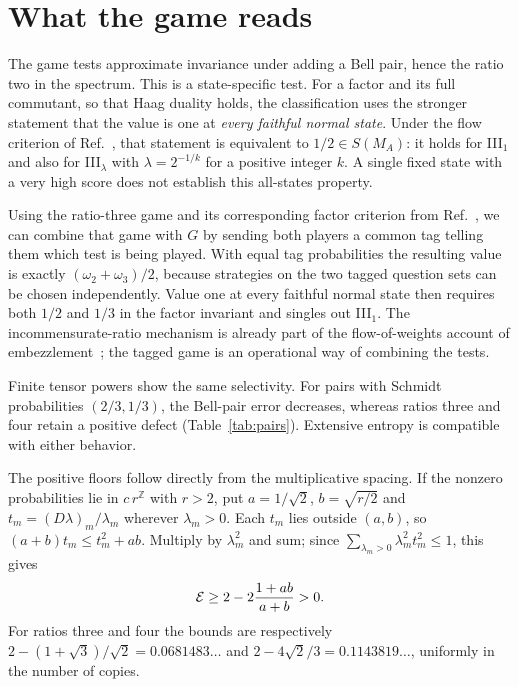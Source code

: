 \section{What the game reads}\label{sec:discussion}

The game tests approximate invariance under adding a Bell pair, hence the
ratio two in the spectrum. This is a state-specific test. For a factor and its full commutant, so that Haag duality holds, the
classification uses the stronger statement that the value is one at
\emph{every faithful normal state}. Under the flow criterion of
Ref.~\cite[Section~4]{TG}, that statement is equivalent to
$1/2\in S(M_A)$: it holds for III$_1$ and also for
III$_\lambda$ with $\lambda=2^{-1/k}$ for a positive integer $k$.
A single fixed state with a very high score does not establish this
all-states property.

Using the ratio-three game and its corresponding factor criterion from Ref.~\cite{TG}, we can combine that game with $G$ by sending
both players a common tag telling them which test is being played.
With equal tag probabilities the resulting value is exactly
$(\omega_2+\omega_3)/2$, because strategies on the two tagged question
sets can be chosen independently. Value one at every faithful normal state
then requires both $1/2$ and $1/3$ in the factor invariant and singles out
III$_1$. The incommensurate-ratio mechanism is already part of the
flow-of-weights account of embezzlement~\cite{vLSWW24}; the tagged game is
an operational way of combining the tests.

Finite tensor powers show the same selectivity. For pairs with Schmidt
probabilities $(2/3,1/3)$, the Bell-pair error decreases, whereas ratios
three and four retain a positive defect (Table~\ref{tab:pairs}). Extensive
entropy is compatible with either behavior.

The positive floors follow directly from the multiplicative spacing.
If the nonzero probabilities lie in $c\,r^{\mathbb Z}$ with $r>2$, put
$a=1/\sqrt2$, $b=\sqrt{r/2}$ and
$t_m=(D\lambda)_m/\lambda_m$ wherever $\lambda_m>0$.
Each $t_m$ lies outside $(a,b)$, so
$(a+b)t_m\le t_m^2+ab$. Multiply by $\lambda_m^2$ and sum;
since $\sum_{\lambda_m>0}\lambda_m^2t_m^2\le1$, this gives
\[
\mathcal{E}\ge2-2\frac{1+ab}{a+b}>0.
\]
For ratios three and four the bounds are respectively
$2-(1+\sqrt3)/\sqrt2=0.0681483\ldots$ and
$2-4\sqrt2/3=0.1143819\ldots$, uniformly in the number of copies.

